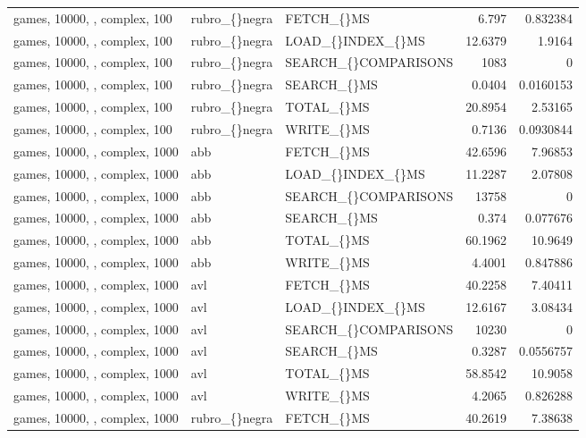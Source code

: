 \begin{longtable}{p{4cm}p{1.4cm}p{2.6cm}rr}
games, 10000, , complex, 100 & rubro\_\allowbreak\{\}negra & FETCH\_\allowbreak\{\}MS & 6.797 & 0.832384\\
games, 10000, , complex, 100 & rubro\_\allowbreak\{\}negra & LOAD\_\allowbreak\{\}INDEX\_\allowbreak\{\}MS & 12.6379 & 1.9164\\
games, 10000, , complex, 100 & rubro\_\allowbreak\{\}negra & SEARCH\_\allowbreak\{\}COMPARISONS & 1083 & 0\\
games, 10000, , complex, 100 & rubro\_\allowbreak\{\}negra & SEARCH\_\allowbreak\{\}MS & 0.0404 & 0.0160153\\
games, 10000, , complex, 100 & rubro\_\allowbreak\{\}negra & TOTAL\_\allowbreak\{\}MS & 20.8954 & 2.53165\\
games, 10000, , complex, 100 & rubro\_\allowbreak\{\}negra & WRITE\_\allowbreak\{\}MS & 0.7136 & 0.0930844\\
games, 10000, , complex, 1000 & abb & FETCH\_\allowbreak\{\}MS & 42.6596 & 7.96853\\
games, 10000, , complex, 1000 & abb & LOAD\_\allowbreak\{\}INDEX\_\allowbreak\{\}MS & 11.2287 & 2.07808\\
games, 10000, , complex, 1000 & abb & SEARCH\_\allowbreak\{\}COMPARISONS & 13758 & 0\\
games, 10000, , complex, 1000 & abb & SEARCH\_\allowbreak\{\}MS & 0.374 & 0.077676\\
games, 10000, , complex, 1000 & abb & TOTAL\_\allowbreak\{\}MS & 60.1962 & 10.9649\\
games, 10000, , complex, 1000 & abb & WRITE\_\allowbreak\{\}MS & 4.4001 & 0.847886\\
games, 10000, , complex, 1000 & avl & FETCH\_\allowbreak\{\}MS & 40.2258 & 7.40411\\
games, 10000, , complex, 1000 & avl & LOAD\_\allowbreak\{\}INDEX\_\allowbreak\{\}MS & 12.6167 & 3.08434\\
games, 10000, , complex, 1000 & avl & SEARCH\_\allowbreak\{\}COMPARISONS & 10230 & 0\\
games, 10000, , complex, 1000 & avl & SEARCH\_\allowbreak\{\}MS & 0.3287 & 0.0556757\\
games, 10000, , complex, 1000 & avl & TOTAL\_\allowbreak\{\}MS & 58.8542 & 10.9058\\
games, 10000, , complex, 1000 & avl & WRITE\_\allowbreak\{\}MS & 4.2065 & 0.826288\\
games, 10000, , complex, 1000 & rubro\_\allowbreak\{\}negra & FETCH\_\allowbreak\{\}MS & 40.2619 & 7.38638\\

\end{longtable}
